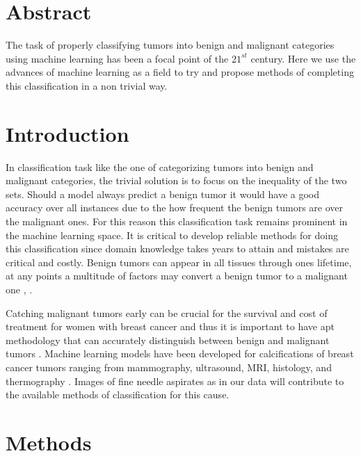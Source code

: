 \documentclass[12pt, a4paper]{article}
\begin{document}
\begin{multicols}{2}

    \section*{Abstract} \label{sec:abs}

    The task of properly classifying tumors into benign and malignant categories using machine learning has been a focal point of the $21^{st}$ century. Here we use the advances of machine learning as a field to try and propose methods of completing this classification in a non trivial way.
    \newline

    \section{Introduction} \label{sec:intro}

    In classification task like the one of categorizing tumors into benign and malignant categories, the trivial solution is to focus on the inequality of the two sets. Should a model always predict a benign tumor it would have a good accuracy over all instances due to the how frequent the benign tumors are over the malignant ones. For this reason this classification task remains prominent in the machine learning space. It is critical to develop reliable methods for doing this classification since domain knowledge takes years to attain and mistakes are critical and costly. Benign tumors can appear in all tissues through ones lifetime, at any points a multitude of factors may convert a benign tumor to a malignant one \cite{koten_transition_1991}, \cite{koten_difference_1993}.
    \newline

    Catching malignant tumors early can be crucial for the survival and cost of treatment for women with breast cancer and thus it is important to have apt methodology that can accurately distinguish between benign and malignant tumors \cite{din_breast_2022}. Machine learning models have been developed for calcifications of breast cancer tumors ranging from mammography, ultrasound, MRI, histology, and thermography \cite{radak_machine_2023}. Images of fine needle aspirates as in our data will contribute to the available methods of classification for this cause.
    \newline

    \section{Methods} \label{sec:methods}


\end{multicols}
\end{document}
